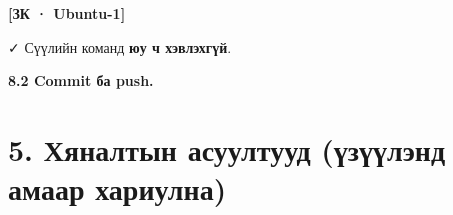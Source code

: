 \textbf{{[}ЗК · Ubuntu-1{]}}

\begin{Shaded}
\begin{Highlighting}[]
\BuiltInTok{[} \BuiltInTok{ ]} \KeywordTok{\&\&} 
\KeywordTok{|} 
\end{Highlighting}
\end{Shaded}

✓ Сүүлийн команд \textbf{юу ч хэвлэхгүй}.

\textbf{8.2 Commit ба push.}

\begin{Shaded}
\begin{Highlighting}[]
\KeywordTok{\&\&} 
\end{Highlighting}
\end{Shaded}

\hypertarget{ux445ux44fux43dux430ux43bux442ux44bux43d-ux430ux441ux443ux443ux43bux442ux443ux443ux434-ux4afux437ux4afux4afux43bux44dux43dux434-ux430ux43cux430ux430ux440-ux445ux430ux440ux438ux443ux43bux43dux430}{%
\section{5. Хяналтын асуултууд (үзүүлэнд амаар хариулна)}\label{ux445ux44fux43dux430ux43bux442ux44bux43d-ux430ux441ux443ux443ux43bux442ux443ux443ux434-ux4afux437ux4afux4afux43bux44dux43dux434-ux430ux43cux430ux430ux440-ux445ux430ux440ux438ux443ux43bux43dux430}}

